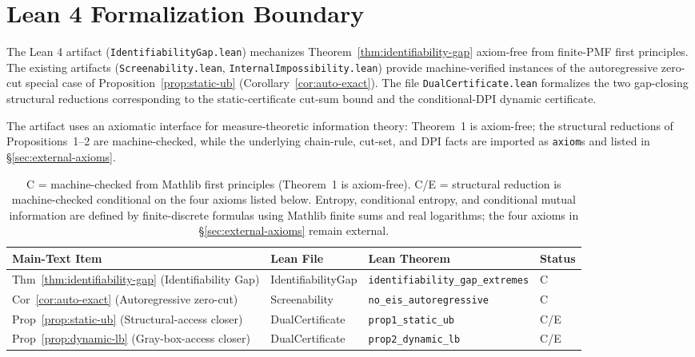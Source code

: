 \documentclass{article}
\begin{document}
\section{Lean 4 Formalization Boundary}
\label{app:lean-boundary}

The Lean 4 artifact (\texttt{IdentifiabilityGap.lean}) mechanizes Theorem~\ref{thm:identifiability-gap} axiom-free from finite-PMF first principles. The existing artifacts (\texttt{Screenability.lean}, \texttt{InternalImpossibility.lean}) provide machine-verified instances of the autoregressive zero-cut special case of Proposition~\ref{prop:static-ub} (Corollary~\ref{cor:auto-exact}). The file \texttt{DualCertificate.lean} formalizes the two gap-closing structural reductions corresponding to the static-certificate cut-sum bound and the conditional-DPI dynamic certificate.

The artifact uses an axiomatic interface for measure-theoretic information theory: Theorem~1 is axiom-free; the structural reductions of Propositions~1--2 are machine-checked, while the underlying chain-rule, cut-set, and DPI facts are imported as \texttt{axiom}s and listed in \S\ref{sec:external-axioms}.

\begin{table}[h]
\centering
\small
\begin{tabular}{llll}
\toprule
Main-Text Item & Lean File & Lean Theorem & Status \\
\midrule
Thm~\ref{thm:identifiability-gap} (Identifiability Gap) & IdentifiabilityGap & \texttt{identifiability\_gap\_extremes} & C \\
Cor~\ref{cor:auto-exact} (Autoregressive zero-cut) & Screenability & \texttt{no\_eis\_autoregressive} & C \\
Prop~\ref{prop:static-ub} (Structural-access closer) & DualCertificate & \texttt{prop1\_static\_ub} & C/E \\
Prop~\ref{prop:dynamic-lb} (Gray-box-access closer) & DualCertificate & \texttt{prop2\_dynamic\_lb} & C/E \\
\bottomrule
\end{tabular}
\caption{C = machine-checked from Mathlib first principles (Theorem~1 is axiom-free). C/E = structural reduction is machine-checked conditional on the four axioms listed below. Entropy, conditional entropy, and conditional mutual information are defined by finite-discrete formulas using Mathlib finite sums and real logarithms; the four axioms in \S\ref{sec:external-axioms} remain external.}
\label{tab:lean}
\end{table}
\end{document}
